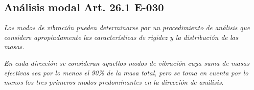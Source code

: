 \documentclass{article}%
\begin{document}
\subsection{Análisis modal Art. 26.1 E-030}%
\label{subsec:AnlisismodalArt.26.1E{-}030}%
\begin{tcolorbox}[colback=gray!5!white,colframe=Maroon!75!black,fonttitle=\bfseries,title=Art. 26.1.1]%
\textit{Los modos de vibración pueden determinarse por un procedimiento de análisis que considere apropiadamente las características de rigidez y la distribución de las masas.}%
\end{tcolorbox}%
\begin{tcolorbox}[colback=gray!5!white,colframe=Maroon!75!black,fonttitle=\bfseries,title=Art. 29.1.2]%
\textit{En cada dirección se consideran aquellos modos de vibración cuya suma de masas efectivas sea por lo menos el 90\% de la masa total, pero se toma en cuenta por lo menos los tres primeros modos predominantes en la dirección de análisis.}%
\end{tcolorbox}%
\end{document}
